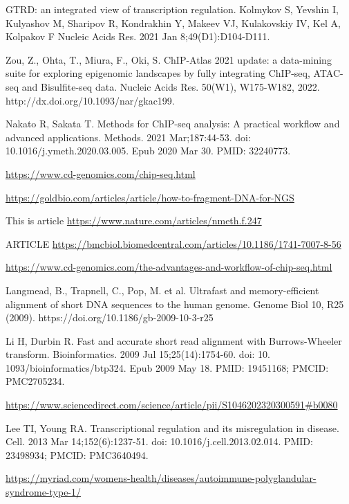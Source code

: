 \documentclass[12pt]{article}
\begin{document}

\begin{thebibliography}{99}

 GTRD: an integrated view of transcription regulation.
Kolmykov S, Yevshin I, Kulyashov M, Sharipov R, Kondrakhin Y, Makeev VJ,
Kulakovskiy IV, Kel A, Kolpakov F Nucleic Acids Res. 2021 Jan
8;49(D1):D104-D111.

 Zou, Z., Ohta, T., Miura, F., Oki, S. ChIP-Atlas 2021
update: a data-mining suite for exploring epigenomic landscapes by fully
integrating ChIP-seq, ATAC-seq and Bisulfite-seq data. Nucleic Acids Res.
50(W1), W175-W182, 2022. http://dx.doi.org/10.1093/nar/gkac199.

 Nakato R, Sakata T. Methods for ChIP-seq analysis: A
practical workflow and advanced applications. Methods. 2021 Mar;187:44-53.
doi: 10.1016/j.ymeth.2020.03.005. Epub 2020 Mar 30. PMID: 32240773.

 \url{https://www.cd-genomics.com/chip-seq.html}

\url{https://goldbio.com/articles/article/how-to-fragment-DNA-for-NGS}

 This is article
\url{https://www.nature.com/articles/nmeth.f.247}

 ARTICLE
\url{https://bmcbiol.biomedcentral.com/articles/10.1186/1741-7007-8-56}

 \url{https://www.cd-genomics.com/the-advantages-and-workflow-of-chip-seq.html}

 Langmead, B., Trapnell, C., Pop, M. et al. Ultrafast and
memory-efficient alignment of short DNA sequences to the human genome. Genome
Biol 10, R25 (2009). https://doi.org/10.1186/gb-2009-10-3-r25

 Li H, Durbin R. Fast and accurate short read alignment with
Burrows-Wheeler transform. Bioinformatics. 2009 Jul 15;25(14):1754-60. doi: 10.
1093/bioinformatics/btp324. Epub 2009 May 18. PMID: 19451168; PMCID: PMC2705234.

 \url{https://www.sciencedirect.com/science/article/pii/S1046202320300591#b0080}

 Lee TI, Young RA. Transcriptional regulation and its
misregulation in disease. Cell. 2013 Mar 14;152(6):1237-51.
doi: 10.1016/j.cell.2013.02.014. PMID: 23498934; PMCID: PMC3640494.

 \url{https://myriad.com/womens-health/diseases/autoimmune-polyglandular-syndrome-type-1/}


\end{thebibliography}
\end{document}
